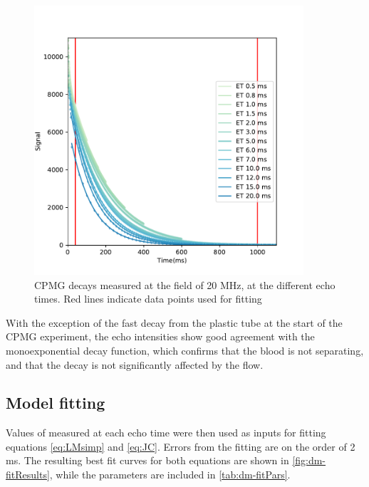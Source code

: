\begin{figure}[h]
\centering
\includegraphics[width=10cm]{figures/diffmodels/20MHzT2fit.pdf}

\caption{CPMG decays measured at the field of 20 MHz, at the different echo times. Red lines indicate data points used for fitting}
\label{fig:dm-CPMGdecay}
\end{figure}

With the exception of the fast decay from the plastic tube at the start of the CPMG experiment, the echo intensities show good agreement with the monoexponential decay function, which confirms that the blood is not separating, and that the decay is not significantly affected by the flow.

\subsection{Model fitting}

Values of \Ttwo measured at each echo time were then used as inputs for fitting equations \ref{eq:LMsimp} and \ref{eq:JC}.
Errors from the \Ttwo fitting are on the order of 2 ms.
The resulting best fit curves for both equations are shown in \autoref{fig:dm-fitResults}, while the parameters are included in \autoref{tab:dm-fitPars}.


